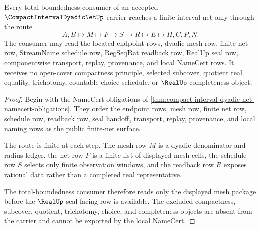 \begin{theorem}
\label{thm:compact-interval-dyadic-net-total-bounded-route}
Every total-boundedness consumer of an accepted $\CompactIntervalDyadicNetUp$ carrier reaches a finite interval net only through the route
$$
A,B\longmapsto M\longmapsto F\longmapsto S\longmapsto R\longmapsto E\longmapsto H,C,P,N .
$$
The consumer may read the located endpoint rows, dyadic mesh row, finite net row, StreamName schedule row, RegSeqRat readback row, RealUp seal row, componentwise transport, replay, provenance, and local NameCert rows. It receives no open-cover compactness principle, selected subcover, quotient real equality, trichotomy, countable-choice schedule, or $\RealUp$ completeness object.
\end{theorem}
\begin{proof}
Begin with the NameCert obligations of \autoref{thm:compact-interval-dyadic-net-namecert-obligations}. They order the endpoint rows, mesh row, finite net row, schedule row, readback row, seal handoff, transport, replay, provenance, and local naming rows as the public finite-net surface.

The route is finite at each step. The mesh row $M$ is a dyadic denominator and radius ledger, the net row $F$ is a finite list of displayed mesh cells, the schedule row $S$ selects only finite observation windows, and the readback row $R$ exposes rational data rather than a completed real representative.

The total-boundedness consumer therefore reads only the displayed mesh package before the $\RealUp$ seal-facing row is available. The excluded compactness, subcover, quotient, trichotomy, choice, and completeness objects are absent from the carrier and cannot be exported by the local NameCert.
\end{proof}



